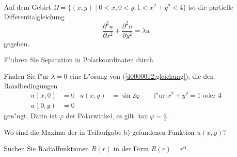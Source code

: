 Auf dem Gebiet $\Omega=\{(x,y)\;|\;0<x,0 < y, 1 < x^2+y^2< 4\}$
ist die partielle Differentialgleichung
\begin{equation}
\frac{\partial^2 u}{\partial x^2}+\frac{\partial^2u}{\partial y^2}=\lambda u
\label{40000012:gleichung}
\end{equation}
gegeben.
\begin{teilaufgaben}
\item
F"uhren Sie Separation in Polarkoordinaten durch.
\item
Finden Sie f"ur $\lambda=0$ eine L"osung von
(\ref{40000012:gleichung}), die den Randbedingungen
\begin{align*}
u(x,0)&= 0&u(x,y)&=\sin 2\varphi \qquad \text{f"ur $x^2+y^2=1$ oder $4$}\\
u(0,y)&= 0&      &
\end{align*}
gen"ugt.
Darin ist $\varphi$ der Polarwinkel, es gilt $\tan\varphi=\frac{y}{x}$.
\item
Wo sind die Maxima der in Teilaufgabe b) gefundenen Funktion $u(x,y)$?
\end{teilaufgaben}

\begin{hinweis}
Suchen Sie Radialfunktionen $R(r)$ in der Form $R(r)=r^{\alpha}$.
\end{hinweis}

